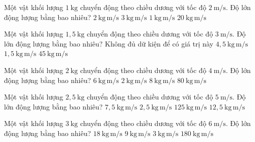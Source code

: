 

\begin{ex}
Một vật khối lượng $1\ \mathrm{kg}$ chuyển động theo chiều dương với tốc độ $2\ \mathrm{m/s}$. Độ lớn động lượng bằng bao nhiêu?
\choice
{\True $2\ \mathrm{kg\,m/s}$}
{$3\ \mathrm{kg\,m/s}$}
{$1\ \mathrm{kg\,m/s}$}
{$20\ \mathrm{kg\,m/s}$}
\end{ex}

\begin{ex}
Một vật khối lượng $1,5\ \mathrm{kg}$ chuyển động theo chiều dương với tốc độ $3\ \mathrm{m/s}$. Độ lớn động lượng bằng bao nhiêu?
\choice
{Không đủ dữ kiện để có giá trị này}
{\True $4,5\ \mathrm{kg\,m/s}$}
{$1,5\ \mathrm{kg\,m/s}$}
{$45\ \mathrm{kg\,m/s}$}
\end{ex}

\begin{ex}
Một vật khối lượng $2\ \mathrm{kg}$ chuyển động theo chiều dương với tốc độ $4\ \mathrm{m/s}$. Độ lớn động lượng bằng bao nhiêu?
\choice
{$6\ \mathrm{kg\,m/s}$}
{$2\ \mathrm{kg\,m/s}$}
{\True $8\ \mathrm{kg\,m/s}$}
{$80\ \mathrm{kg\,m/s}$}
\end{ex}

\begin{ex}
Một vật khối lượng $2,5\ \mathrm{kg}$ chuyển động theo chiều dương với tốc độ $5\ \mathrm{m/s}$. Độ lớn động lượng bằng bao nhiêu?
\choice
{$7,5\ \mathrm{kg\,m/s}$}
{$2,5\ \mathrm{kg\,m/s}$}
{$125\ \mathrm{kg\,m/s}$}
{\True $12,5\ \mathrm{kg\,m/s}$}
\end{ex}

\begin{ex}
Một vật khối lượng $3\ \mathrm{kg}$ chuyển động theo chiều dương với tốc độ $6\ \mathrm{m/s}$. Độ lớn động lượng bằng bao nhiêu?
\choice
{\True $18\ \mathrm{kg\,m/s}$}
{$9\ \mathrm{kg\,m/s}$}
{$3\ \mathrm{kg\,m/s}$}
{$180\ \mathrm{kg\,m/s}$}
\end{ex}

